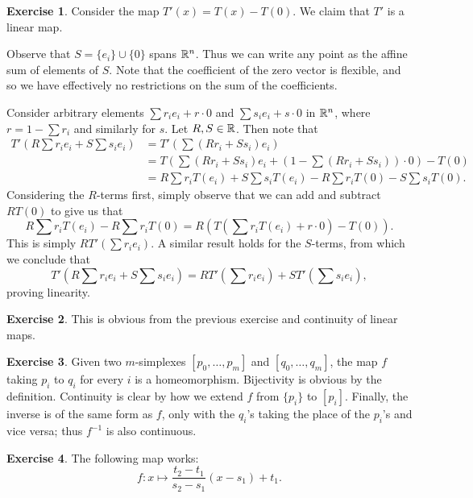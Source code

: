 \documentclass[10pt]{article}
\theoremstyle{definition}
\newtheorem{intex}{Exercise}[section]
\newenvironment{exercise}{\begin{intex}\label{\theintex}}{\end{intex}}
\begin{document}
\begin{exercise} \leavevmode
Consider the map $T'(x)=T(x)-T(0)$. We claim that $T'$ is a linear map. 

Observe that $S=\{e_i\}\cup\{0\}$ spans $\mathbb{R}^n$. Thus we can write any point as the affine sum of elements of $S$. Note that the coefficient of the zero vector is flexible, and so we have effectively no restrictions on the sum of the coefficients. 

Consider arbitrary elements $\sum r_ie_i+r\cdot0$ and $\sum s_ie_i+s\cdot0$ in $\mathbb{R}^n$, where $r=1-\sum r_i$ and similarly for $s$. Let $R,S\in\mathbb{R}$. Then note that \begin{align*}T'\left(R\sum r_ie_i+S\sum s_ie_i\right)&=T'\left(\sum(Rr_i+Ss_i)e_i\right)\\&= T\left(\sum(Rr_i+Ss_i)e_i+\left(1-\sum(Rr_i+Ss_i)\right)\cdot0\right)-T(0)\\&=R\sum r_iT(e_i)+S\sum s_iT(e_i)-R\sum r_iT(0)-S\sum s_iT(0).\end{align*} Considering the $R$-terms first, simply observe that we can add and subtract $RT(0)$ to give us that \[R\sum r_iT(e_i)-R\sum r_iT(0)=R\left(T\left(\sum r_i T(e_i)+r\cdot0\right)-T(0)\right).\] This is simply $RT'\left(\sum r_ie_i\right)$. A similar result holds for the $S$-terms, from which we conclude that \[T'\left(R\sum r_ie_i+S\sum s_ie_i\right)=RT'\left(\sum r_ie_i\right)+ST'\left(\sum s_ie_i\right),\] proving linearity. 
\end{exercise} 

\begin{exercise} \leavevmode
This is obvious from the previous exercise and continuity of linear maps. 
\end{exercise} 

\begin{exercise} \leavevmode
Given two $m$-simplexes $[p_0,\dots,p_m]$ and $[q_0,\dots,q_m]$, the map $f$ taking $p_i$ to $q_i$ for every $i$ is a homeomorphism. Bijectivity is obvious by the definition. Continuity is clear by how we extend $f$ from $\{p_i\}$ to $[p_i]$. Finally, the inverse is of the same form as $f$, only with the $q_i$'s taking the place of the $p_i$'s and vice versa; thus $f^{-1}$ is also continuous. 
\end{exercise} 

\begin{exercise} \leavevmode
The following map works: \[f:x\mapsto\frac{t_2-t_1}{s_2-s_1}(x-s_1)+t_1.\] 
\end{exercise} 
\end{document}
